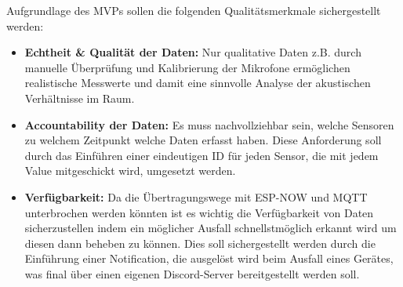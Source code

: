 \begin{center}
\end{center}

Aufgrundlage des MVPs sollen die folgenden Qualitätsmerkmale sichergestellt werden:
\begin{itemize}
    \item \textbf{Echtheit \& Qualität der Daten:}
    Nur qualitative Daten z.B. durch manuelle Überprüfung und Kalibrierung der Mikrofone ermöglichen realistische Messwerte und damit eine sinnvolle Analyse der akustischen Verhältnisse im Raum.
\item \textbf{Accountability der Daten:}
    Es muss nachvollziehbar sein, welche Sensoren zu welchem Zeitpunkt welche Daten erfasst haben. Diese Anforderung soll durch das Einführen einer eindeutigen ID für jeden Sensor, die mit jedem Value mitgeschickt wird, umgesetzt werden.
    \item \textbf{Verfügbarkeit:}
    Da die Übertragungswege mit ESP-NOW und MQTT unterbrochen werden könnten ist es wichtig die Verfügbarkeit von Daten sicherzustellen indem ein möglicher Ausfall schnellstmöglich erkannt wird um diesen dann beheben zu können. Dies soll sichergestellt werden durch die Einführung einer Notification, die ausgelöst wird beim Ausfall eines Gerätes, was final über einen eigenen Discord-Server bereitgestellt werden soll.
\end{itemize}
